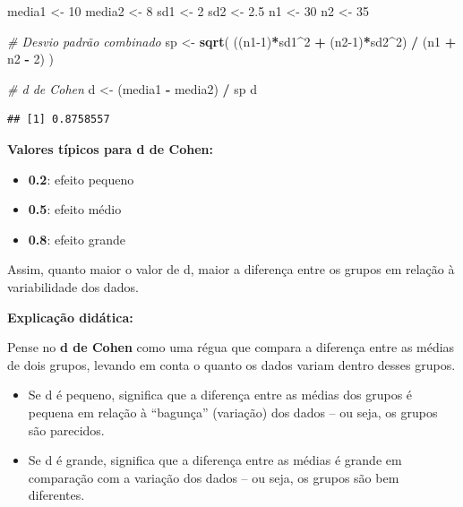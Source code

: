 \documentclass[
]{book}
\newenvironment{Shaded}{\begin{snugshade}}{\end{snugshade}}
\newcommand{\CommentTok}[1]{\textcolor[rgb]{0.56,0.35,0.01}{\textit{#1}}}
\newcommand{\DecValTok}[1]{\textcolor[rgb]{0.00,0.00,0.81}{#1}}
\newcommand{\FloatTok}[1]{\textcolor[rgb]{0.00,0.00,0.81}{#1}}
\newcommand{\FunctionTok}[1]{\textcolor[rgb]{0.13,0.29,0.53}{\textbf{#1}}}
\newcommand{\NormalTok}[1]{#1}
\newcommand{\OtherTok}[1]{\textcolor[rgb]{0.56,0.35,0.01}{#1}}
\newcommand{\SpecialCharTok}[1]{\textcolor[rgb]{0.81,0.36,0.00}{\textbf{#1}}}
\providecommand{\tightlist}{%
  \setlength{\itemsep}{0pt}\setlength{\parskip}{0pt}}
\begin{document}
\begin{Shaded}
\begin{Highlighting}[]
\NormalTok{media1 }\OtherTok{\textless{}{-}} \DecValTok{10}
\NormalTok{media2 }\OtherTok{\textless{}{-}} \DecValTok{8}
\NormalTok{sd1 }\OtherTok{\textless{}{-}} \DecValTok{2}
\NormalTok{sd2 }\OtherTok{\textless{}{-}} \FloatTok{2.5}
\NormalTok{n1 }\OtherTok{\textless{}{-}} \DecValTok{30}
\NormalTok{n2 }\OtherTok{\textless{}{-}} \DecValTok{35}

\CommentTok{\# Desvio padrão combinado}
\NormalTok{sp }\OtherTok{\textless{}{-}} \FunctionTok{sqrt}\NormalTok{( ((n1}\DecValTok{{-}1}\NormalTok{)}\SpecialCharTok{*}\NormalTok{sd1}\SpecialCharTok{\^{}}\DecValTok{2} \SpecialCharTok{+}\NormalTok{ (n2}\DecValTok{{-}1}\NormalTok{)}\SpecialCharTok{*}\NormalTok{sd2}\SpecialCharTok{\^{}}\DecValTok{2}\NormalTok{) }\SpecialCharTok{/}\NormalTok{ (n1 }\SpecialCharTok{+}\NormalTok{ n2 }\SpecialCharTok{{-}} \DecValTok{2}\NormalTok{) )}

\CommentTok{\# d de Cohen}
\NormalTok{d }\OtherTok{\textless{}{-}}\NormalTok{ (media1 }\SpecialCharTok{{-}}\NormalTok{ media2) }\SpecialCharTok{/}\NormalTok{ sp}
\NormalTok{d}
\end{Highlighting}
\end{Shaded}

\begin{verbatim}
## [1] 0.8758557
\end{verbatim}

\textbf{Valores típicos para d de Cohen:}

\begin{itemize}
\tightlist
\item
  \textbf{0.2}: efeito pequeno\\
\item
  \textbf{0.5}: efeito médio\\
\item
  \textbf{0.8}: efeito grande
\end{itemize}

Assim, quanto maior o valor de d, maior a diferença entre os grupos em relação à variabilidade dos dados.

\textbf{Explicação didática:}

Pense no \textbf{d de Cohen} como uma régua que compara a diferença entre as médias de dois grupos, levando em conta o quanto os dados variam dentro desses grupos.

\begin{itemize}
\tightlist
\item
  Se d é pequeno, significa que a diferença entre as médias dos grupos é pequena em relação à ``bagunça'' (variação) dos dados -- ou seja, os grupos são parecidos.
\item
  Se d é grande, significa que a diferença entre as médias é grande em comparação com a variação dos dados -- ou seja, os grupos são bem diferentes.
\end{itemize}
\end{document}
